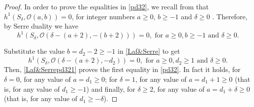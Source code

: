 \documentclass{amsart} %
\theoremstyle{definition}
\newcommand{\mcO}{\mathcal{O}}
\begin{document}
\begin{proof}

In order to prove the equalities in \eqref{pd32}, we recall from \cite[Proposition 2.3]{Laface} that
  $ h^1(S_{\delta},\mcO(a, b)) = 0 $, for integer numbers $ a\geq 0 $, $ b\geq -1 $ and $ \delta \geq 0 $ .
  Therefore, by Serre duality we have
  \begin{equation}\label{Laf&Serre}
   h^1(S_{\delta},\mcO(\delta -(a+2), -(b+2))) = 0, \text{ for }  a\geq 0, b\geq -1 \text{ and } \delta \geq 0.
  \end{equation}

Substitute the value $ b = d_2 - 2 \geq -1 $ in \eqref{Laf&Serre} to get
  \begin{equation}\label{Laf&Serrepd321}
   h^1(S_{\delta},\mcO(\delta -(a+2), -d_2)) = 0, \text{ for }  a\geq 0, d_2\geq 1 \text{ and } \delta \geq 0.
  \end{equation}
Then, \eqref{Laf&Serrepd321} proves the first equality in \eqref{pd32}.
In fact it holds, for $ \delta = 0 $,
for any value of $ a = d_1 \geq 0 $; for $ \delta = 1 $, for any value of $ a = d_1 + 1 \geq 0 $ (that is,
for any value of $ d_1 \geq -1 $) and finally, for $ \delta \geq 2 $, for any value of
$ a = d_1 + \delta \geq 0 $ (that is, for any value of $ d_1 \geq -\delta $).


\end{proof}
\end{document}
